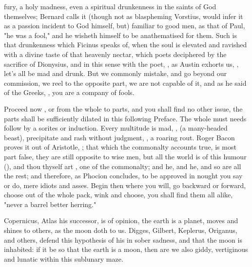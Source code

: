 fury, a holy madness, even a spiritual drunkenness in the saints of God
themselves;  Bernard calls it (though not as blaspheming
Vorstius, would infer it as a passion incident to God
himself, but) familiar to good men, as that of Paul,  "he was a
fool," \etc{} and  he wisheth himself to be
anathematised for them. Such is that drunkenness which Ficinus speaks of, when
the soul is elevated and ravished with a divine taste of that heavenly nectar,
which poets deciphered by the sacrifice of Dionysius, and in this sense with
the poet, , as Austin exhorts us, , let's all be mad and drunk.
But we commonly mistake, and go beyond our commission, we reel to the opposite
part, we are not capable of it, and as
he said of the Greeks, , \etc{} you are a company of fools.

Proceed now , or from the whole to parts, and you shall
find no other issue, the parts shall be sufficiently dilated in this following
Preface. The whole must needs follow by a sorites or induction. Every multitude
is mad, , (a many-headed
beast), precipitate and rash without judgment, , a roaring
rout. Roger Bacon proves it out of Aristotle, ;
that which the commonalty accounts true, is most part false, they are still
opposite to wise men, but all the world is of this humour (), and
thou thyself art , one of the commonalty; and he, and he, and so
are all the rest; and therefore, as Phocion concludes, to be approved in nought
you say or do, mere idiots and asses. Begin then where you will, go backward or
forward, choose out of the whole pack, wink and choose, you shall find them all
alike, "never a barrel better herring."

Copernicus, Atlas his successor, is of opinion, the earth is a planet, moves
and shines to others, as the moon doth to us. Digges, Gilbert, Keplerus,
Origanus, and others, defend this hypothesis of his in sober sadness, and that
the moon is inhabited: if it be so that the earth is a moon, then are we also
giddy, vertiginous and lunatic within this sublunary maze.

